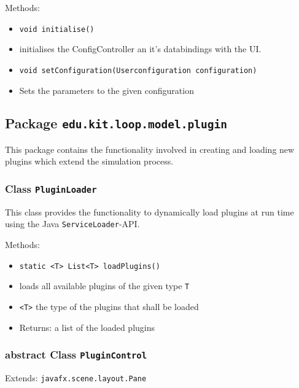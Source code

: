 \documentclass[parskip=full,11pt]{scrartcl}
\begin{document}
Methods:
\begin{itemize}\itemsep -10pt
\item \texttt{void initialise()}
\item[] initialises the ConfigController an it's databindings with the UI.

\item \texttt{void setConfiguration(Userconfiguration configuration)}
\item[] Sets the parameters to the given configuration

\end{itemize}

\subsection{Package \texttt{edu.kit.loop.model.plugin}}

This package contains the functionality involved in creating and loading new plugins which extend the simulation process.

\subsubsection{Class \texttt{PluginLoader}}

This class provides the functionality to dynamically load plugins at run time using the Java \texttt{ServiceLoader}-API.

Methods:

\begin{itemize}\itemsep -10pt
	\item \texttt{static <T> List<T> loadPlugins()}
	\item[] loads all available plugins of the given type \texttt{T}
	\item[] \texttt{<T>} the type of the plugins that shall be loaded
	\item[]Returns: a list of the loaded plugins
\end{itemize}

\subsubsection{abstract Class \texttt{PluginControl}}
Extends: \texttt{javafx.scene.layout.Pane}
\end{document}
